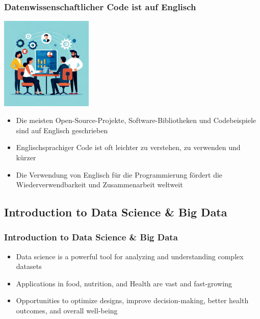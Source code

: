 \documentclass{beamer}
\begin{document}
    \begin{frame}
        \frametitle{Datenwissenschaftlicher Code ist auf Englisch}
        \begin{center}
            \includegraphics[width=0.33\textwidth]{figures/healthcare-analytics.png}
        \end{center}
        \begin{itemize}
            \item Die meisten Open-Source-Projekte, Software-Bibliotheken und Codebeispiele sind auf Englisch geschrieben
            \item Englischsprachiger Code ist oft leichter zu verstehen, zu verwenden und kürzer
            \item Die Verwendung von Englisch für die Programmierung fördert die Wiederverwendbarkeit und Zusammenarbeit weltweit
        \end{itemize}
        
    \end{frame}
    \subsection{Introduction to Data Science \& Big Data} 
    \begin{frame}
        \frametitle{Introduction to Data Science \& Big Data}
        \begin{itemize}
            \item Data science is a powerful tool for analyzing and understanding complex datasets
            \item Applications in food, nutrition, and Health are vast and fast-growing
            \item Opportunities to optimize designs, improve decision-making, better health outcomes, and overall well-being
        \end{itemize}
    \end{frame}
        
\end{document}
